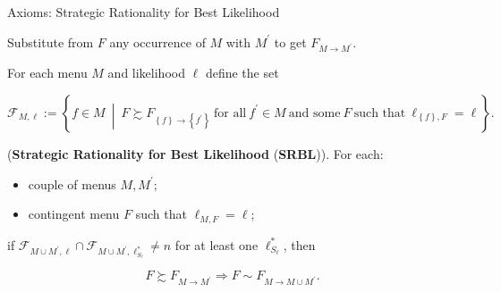 \documentclass[usenames,dvipsnames,aspectratio=169,11pt]{beamer}
\begin{document}
\begin{frame}{Axioms: Strategic Rationality for Best Likelihood}\label{srblapp}

	Substitute from \( F \) any occurrence of \( M \) with \( M^{\prime} \) to get \( F_{M \rightarrow M^{\prime}} \).

	\vfill

	For each menu \( M \) and likelihood \( \ell \) define the set

	\[
		\mathcal{F}_{M, \ell} := \left\{ f \in M \: \middle\vert \: F \succsim F_{\left\{ f \right\} \rightarrow \left\{ f^{\prime} \right\}} \: \text{for all} \: f^{\prime} \in M \: \text{and some} \: F \: \text{such that} \: \ell_{\left\{ f \right\}, F} = \ell \right\} .
	\]

	\begin{axiom}\label{ax:appsrbl}

		(\textbf{Strategic Rationality for Best Likelihood} (\textbf{SRBL})). For each:
		\begin{itemize}
			\item couple of menus \( M, M^{\prime} \);
			\item contingent menu \( F \) such that \( \ell_{M,F} = \ell \);
		\end{itemize}
		if \( \mathcal{F}_{M \cup M^{\prime}, \ell} \cap \mathcal{F}_{M \cup M^{\prime}, \ell^{*}_{S_{\ell}}} \neq n \) for at least one \( \ell_{S_{\ell}}^{*} \), then

		\[
			F \succsim F_{M \rightarrow M^{\prime}} \Rightarrow F \sim F_{M \rightarrow M \cup M^{\prime}} .
		\]

	\end{axiom}

	\begin{flushright}
		\hyperlink{srbl}{}
	\end{flushright}


\end{frame}
\end{document}
